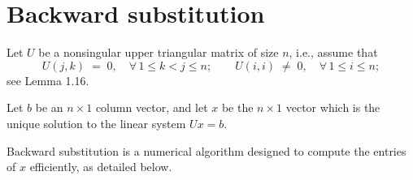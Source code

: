 
\section{Backward substitution}

Let $U$ be a nonsingular upper triangular matrix of size $n$, i.e., assume that
\begin{equation}
U(j,k) \;=\; 0, \quad \forall\, 1\le k<j\le n; \qquad U(i,i) \;\neq\; 0, \quad
\forall\, 1\le i\le n;
\end{equation}
see Lemma 1.16.

Let $b$ be an $n\times 1$ column vector, and let $x$ be the $n\times 1$ vector which
is the unique solution to the linear system $Ux = b$.

Backward substitution is a numerical algorithm designed to compute the entries of $x$
efficiently, as detailed below.
